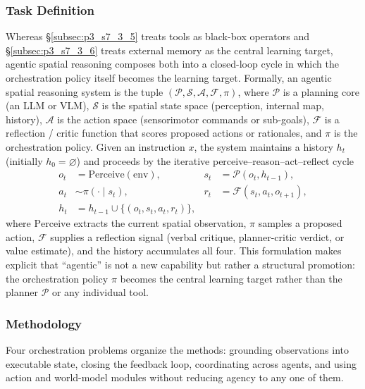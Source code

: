 \subsubsection{Task Definition}
Whereas §\ref{subsec:p3_s7_3_5} treats tools as black-box operators and §\ref{subsec:p3_s7_3_6} treats external memory as the central learning target, agentic spatial reasoning composes both into a closed-loop cycle in which the orchestration policy itself becomes the learning target. Formally, an agentic spatial reasoning system is the tuple $(\mathcal{P}, \mathcal{S}, \mathcal{A}, \mathcal{F}, \pi)$, where $\mathcal{P}$ is a planning core (an LLM or VLM), $\mathcal{S}$ is the spatial state space (perception, internal map, history), $\mathcal{A}$ is the action space (sensorimotor commands or sub-goals), $\mathcal{F}$ is a reflection / critic function that scores proposed actions or rationales, and $\pi$ is the orchestration policy. Given an instruction $x$, the system maintains a history $h_t$ (initially $h_0 = \varnothing$) and proceeds by the iterative perceive--reason--act--reflect cycle
\begin{equation}
\begin{aligned}
o_t &= \mathrm{Perceive}(\text{env}), &
s_t &= \mathcal{P}(o_t, h_{t-1}), \\
a_t &\sim \pi(\cdot \mid s_t), &
r_t &= \mathcal{F}(s_t, a_t, o_{t+1}), \\
h_t &= h_{t-1} \cup \{(o_t, s_t, a_t, r_t)\},
\end{aligned}
\end{equation}
where $\mathrm{Perceive}$ extracts the current spatial observation, $\pi$ samples a proposed action, $\mathcal{F}$ supplies a reflection signal (verbal critique, planner-critic verdict, or value estimate), and the history accumulates all four. This formulation makes explicit that ``agentic'' is not a new capability but rather a structural promotion: the orchestration policy $\pi$ becomes the central learning target rather than the planner $\mathcal{P}$ or any individual tool.

\subsubsection{Methodology}
Four orchestration problems organize the methods: grounding observations into executable state, closing the feedback loop, coordinating across agents, and using action and world-model modules without reducing agency to any one of them.

